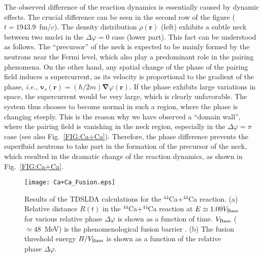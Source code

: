 \documentclass{PoS}
\def\bs#1{\boldsymbol{#1}}
\begin{document}
The observed difference of the reaction dynamics is essentially caused by dynamic
effects. The crucial difference can be seen in the second row of the figure
($t=1943.9$~fm/$c$). The density distribution $\rho(\bs{r})$ (left) exhibits a 
subtle neck between two nuclei in the $\Delta\varphi=0$ case (lower part).
This fact can be understood as follows. The ``precursor'' of the neck is expected to be mainly
formed by the neutrons near the Fermi level, which also play a predominant role in
the pairing phenomena. On the other hand, any spatial change of the phase of the
pairing field induces a supercurrent, as its velocity is proportional to the gradient of
the phase, \textit{i.e.}, $\bs{v}_s(\bs{r}) = (\hbar/2m)\bs{\nabla}\varphi(\bs{r})$.
If the phase exhibits large variations in space, the supercurrent would be very large,
which is clearly unfavorable. The system thus chooses to become normal in
such a region, where the phase is changing steeply. This is the reason why we
have observed a ``domain wall'', where the pairing field is vanishing in the neck
region, especially in the $\Delta\varphi=\pi$ case \cite{soliton} (see also
Fig.~\ref{FIG:Ca+Ca}). Therefore, the phase difference prevents the superfluid
neutrons to take part in the formation of the precursor of the neck, which resulted
in the dramatic change of the reaction dynamics, as shown in Fig.~\ref{FIG:Ca+Ca}.

\begin{figure}[t]
\begin{center}
\texttt{[image: Ca+Ca\_Fusion.eps]}
\end{center}\vspace{-3mm}
\caption{
Results of the TDSLDA calculations for the $^{44}$Ca+$^{44}$Ca reaction.
(a) Relative distance $R(t)$ in the $^{44}$Ca+$^{44}$Ca reaction at
$E \simeq 1.09V_{\rm Bass}$ for various relative phase $\Delta\varphi$
is shown as a function of time. $V_{\rm Bass}$ ($\simeq 48$~MeV) is the
phenomenological fusion barrier \cite{Bass(1974)}. (b) The fusion threshold
energy $B/V_{\rm Bass}$ is shown as a function of the relative phase $\Delta\varphi$.
}
\label{FIG:Fusion}
\end{figure}
\end{document}
